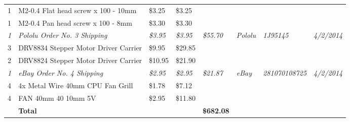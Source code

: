 \begin{table}[h]
{\begin{tabular}{llllllll}
1            & M2-0.4 Flat head screw x 100 - 10mm               & \$3.25           & \$3.25           &                   &                   &                       &                     \\
1            & M2-0.4 Pan head screw x 100 - 8mm                 & \$3.30           & \$3.30           &                   &                   &                       &                     \\  \hline \hline
\textit{1}   & \textit{Pololu Order No. 3 Shipping}              & \textit{\$3.95}  & \textit{\$3.95}  & \textit{\$55.70}  & \textit{Pololu}   & \textit{1J95145}      & \textit{4/2/2014}   \\
3            & DRV8834 Stepper Motor Driver Carrier              & \$9.95           & \$29.85          &                   &                   &                       &                     \\
2            & DRV8824 Stepper Motor Driver Carrier              & \$10.95          & \$21.90          &                   &                   &                       &                     \\  \hline \hline
\textit{1}   & \textit{eBay Order No. 4 Shipping}                & \textit{\$2.95}  & \textit{\$2.95}  & \textit{\$21.87}  & \textit{eBay}     & \textit{281070108725} & \textit{4/2/2014}   \\
4            & 4x Metal Wire 40mm CPU Fan Grill                  & \$1.78           & \$7.12           &                   &                   &                       &                     \\
4            & FAN 40mm 40 10mm 5V                               & \$2.95           & \$11.80          &                   &                   &                       &                     \\  \hline \hline
\textbf{}    & \textbf{Total}                                    & \textbf{}        & \textbf{}        & \textbf{\$682.08} & \textbf{}         & \textbf{}             & \textbf{}          
\end{tabular}}
\end{table}

